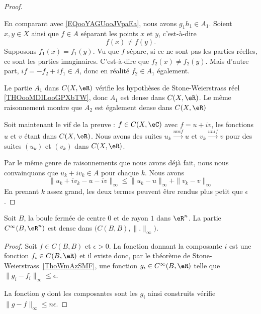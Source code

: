 \begin{proof}
\begin{subproof}
		En comparant avec \eqref{EQooYAGUooJVpaEa}, nous avons \( g_1h_1\in A_1\).
		Soient \( x,y\in X\) ainsi que \( f\in A\) séparant les points \( x\) et \( y\), c'est-à-dire
		\begin{equation}
			f(x)\neq f(y).
		\end{equation}
		Supposons \( f_1(x)=f_1(y)\). Vu que \( f\) sépare, si ce ne sont pas les parties réelles, ce sont les parties imaginaires. C'est-à-dire que  \( f_2(x)\neq f_2(y)\). Mais d'autre part, \( if=-f_2+if_1\in A\),  donc en réalité \( f_2\in A_1\) également.
	\end{subproof}
	Le partie \( A_1\) dans \( C(X,\eR)\) vérifie les hypothèses de Stone-Weierstrass réel \ref{THOooMDILooGPXbTW}, donc \( A_1\) est dense dans \( C(X,\eR)\). Le même raisonnement montre que \( A_2\) est également dense dans \( C(X,\eR)\)

	Soit maintenant le vif de la preuve : \( f\in C(X,\eC)\) avec \( f=u+iv\), les fonctions \( u\) et \( v \) étant dans \( C(X,\eR)\). Nous avons des suites \( u_{k}\stackrel{unif}{\longrightarrow}u\) et \( v_k\stackrel{unif}{\longrightarrow}v\) pour des suites \( (u_k) \) et \( (v_k)\) dans \( C(X,\eR)\).

	Par le même genre de raisonnements que nous avons déjà fait, nous nous convainquons que \( u_k+iv_k\in A\) pour chaque \( k\). Nous avons
	\begin{equation}
		\| u_k+iv_k-u-iv \|_{\infty}\leq \| u_k-u \|_{\infty}+\| v_k-v \|_{\infty}
	\end{equation}
	En prenant \( k\) assez grand, les deux termes peuvent être rendus plus petit que \( \epsilon\).
\end{proof}

\begin{corollary}        \label{CORooNIUJooLDrPSv}
	Soit \( B\), la boule fermée de centre \( 0\) et de rayon \( 1\) dans \( \eR^n\). La partie \( C^{\infty}(B,\eR^n)\) est dense dans \( \big( C(B,B),\| . \|_{\infty} \big)\).
\end{corollary}

\begin{proof}
	Soit \( f \in C(B,B)\) et \( \epsilon>0\). La fonction donnant la composante \( i\) est une fonction \( f_i\in C(B,\eR)\) et il existe donc, par le théorème de Stone-Weierstrass~\ref{ThoWmAzSMF}, une fonction \( g_i\in  C^{\infty}(B,\eR)\) telle que \( \| g_i-f_i \|_{\infty}\leq \epsilon\).

	La fonction \( g\) dont les composantes sont les \( g_i\) ainsi construits vérifie \( \| g-f \|_{\infty}\leq n\epsilon\).
\end{proof}

